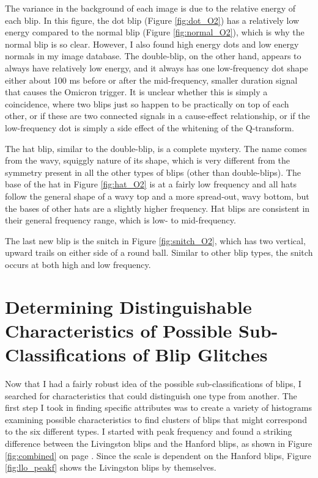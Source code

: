 \documentclass[a4paper]{article}
\begin{document}
The variance in the background of each image is due to the relative energy of each blip. In this figure, the dot blip (Figure \ref{fig:dot_O2}) has a relatively low energy compared to the normal blip (Figure \ref{fig:normal_O2}), which is why the normal blip is so clear. However, I also found high energy dots and low energy normals in my image database. The double-blip, on the other hand, appears to always have relatively low energy, and it always has one low-frequency dot shape either about 100 ms before or after the mid-frequency, smaller duration signal that causes the Omicron trigger. It is unclear whether this is simply a coincidence, where two blips just so happen to be practically on top of each other, or if these are two connected signals in a cause-effect relationship, or if the low-frequency dot is simply a side effect of the whitening of the Q-transform. 

The hat blip, similar to the double-blip, is a complete mystery. The name comes from the wavy, squiggly nature of its shape, which is very different from the symmetry present in all the other types of blips (other than double-blips). The base of the hat in Figure \ref{fig:hat_O2} is at a fairly low frequency and all hats follow the general shape of a wavy top and a more spread-out, wavy bottom, but the bases of other hats are a slightly higher frequency. Hat blips are consistent in their general frequency range, which is low- to mid-frequency.

The last new blip is the snitch in Figure \ref{fig:snitch_O2}, which has two vertical, upward trails on either side of a round ball. Similar to other blip types, the snitch occurs at both high and low frequency. 

\section{Determining Distinguishable Characteristics of Possible Sub-Classifications of Blip Glitches} \label{plots}

Now that I had a fairly robust idea of the possible sub-classifications of blips, I searched for characteristics that could distinguish one type from another. The first step I took in finding specific attributes was to create a variety of histograms examining possible characteristics to find clusters of blips that might correspond to the six different types. I started with peak frequency and found a striking difference between the Livingston blips and the Hanford blips, as shown in Figure \ref{fig:combined} on page \pageref{fig:combined_peakf}. Since the scale is dependent on the Hanford blips, Figure \ref{fig:llo_peakf} shows the Livingston blips by themselves.
\end{document}
